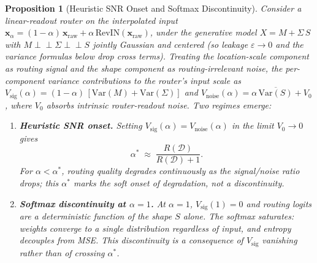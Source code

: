 \documentclass{article}
\newtheorem{proposition}{Proposition}
\begin{document}
\begin{proposition}[Heuristic SNR Onset and Softmax Discontinuity]
\label{prop:phase_transition}
Consider a linear-readout router on the interpolated input $\mathbf{x}_\alpha = (1{-}\alpha)\,\mathbf{x}_\mathrm{raw} + \alpha\,\mathrm{RevIN}(\mathbf{x}_\mathrm{raw})$, under the generative model $X = M + \Sigma\,S$ with $M\perp\!\!\!\perp\Sigma\perp\!\!\!\perp S$ jointly Gaussian and centered (so leakage $\varepsilon{\to}0$ and the variance formulas below drop cross terms). Treating the location-scale component as routing \emph{signal} and the shape component as routing-irrelevant \emph{noise}, the per-component variance contributions to the router's input scale as $V_\mathrm{sig}(\alpha) = (1{-}\alpha)\,[\mathrm{Var}(M){+}\mathrm{Var}(\Sigma)]$ and $V_\mathrm{noise}(\alpha) = \alpha\,\overline{\mathrm{Var}(S)} + V_0$, where $V_0$ absorbs intrinsic router-readout noise. Two regimes emerge:
\begin{enumerate}
    \item[\textup{(a)}] \textbf{Heuristic SNR onset.} Setting $V_\mathrm{sig}(\alpha) = V_\mathrm{noise}(\alpha)$ in the limit $V_0 \to 0$ gives
    \[
        \alpha^* \;\approx\; \frac{R(\mathcal{D})}{R(\mathcal{D}) + 1}.
    \]
    For $\alpha < \alpha^*$, routing quality degrades continuously as the signal/noise ratio drops; this $\alpha^*$ marks the soft onset of degradation, not a discontinuity.
    \item[\textup{(b)}] \textbf{Softmax discontinuity at $\alpha{=}1$.} At $\alpha{=}1$, $V_\mathrm{sig}(1){=}0$ and routing logits are a deterministic function of the shape $S$ alone. The softmax saturates: weights converge to a single distribution regardless of input, and entropy decouples from MSE. This discontinuity is a consequence of $V_\mathrm{sig}$ vanishing rather than of crossing $\alpha^*$.
\end{enumerate}
\end{proposition}
\end{document}
